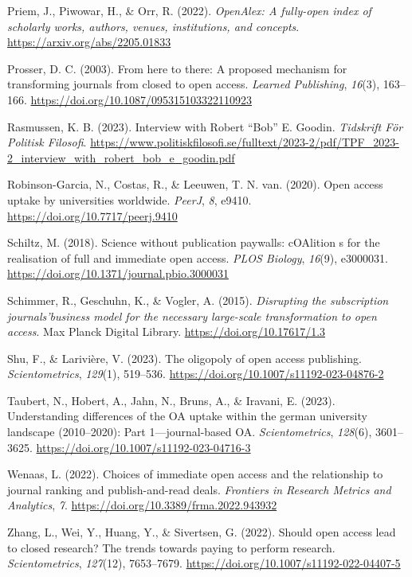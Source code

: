 \documentclass[a4paper,man,floatsintext,longtable,noextraspace,12pt]{apa6}
\newenvironment{CSLReferences}%
  {}%
  {\par}
\begin{document}
\begin{CSLReferences}{1}{0}
\leavevmode{}%
Priem, J., Piwowar, H., \& Orr, R. (2022). \emph{OpenAlex: A fully-open
index of scholarly works, authors, venues, institutions, and concepts}.
\url{https://arxiv.org/abs/2205.01833}

\leavevmode{}%
Prosser, D. C. (2003). From here to there: A proposed mechanism for
transforming journals from closed to open access. \emph{Learned
Publishing}, \emph{16}(3), 163--166.
\url{https://doi.org/10.1087/095315103322110923}

\leavevmode{}%
Rasmussen, K. B. (2023). Interview with {Robert {``Bob''} E. Goodin}.
\emph{Tidskrift För Politisk Filosofi}.
\url{https://www.politiskfilosofi.se/fulltext/2023-2/pdf/TPF_2023-2_interview_with_robert_bob_e_goodin.pdf}

\leavevmode{}%
Robinson-Garcia, N., Costas, R., \& Leeuwen, T. N. van. (2020). Open
access uptake by universities worldwide. \emph{{PeerJ}}, \emph{8},
e9410. \url{https://doi.org/10.7717/peerj.9410}

\leavevmode{}%
Schiltz, M. (2018). Science without publication paywalls: cOAlition s
for the realisation of full and immediate open access. \emph{PLOS
Biology}, \emph{16}(9), e3000031.
\url{https://doi.org/10.1371/journal.pbio.3000031}

\leavevmode{}%
Schimmer, R., Geschuhn, K., \& Vogler, A. (2015). \emph{{Disrupting the
subscription journals'business model for the necessary large-scale
transformation to open access}}. Max Planck Digital Library.
\url{https://doi.org/10.17617/1.3}

\leavevmode{}%
Shu, F., \& Larivière, V. (2023). The oligopoly of open access
publishing. \emph{Scientometrics}, \emph{129}(1), 519--536.
\url{https://doi.org/10.1007/s11192-023-04876-2}

\leavevmode{}%
Taubert, N., Hobert, A., Jahn, N., Bruns, A., \& Iravani, E. (2023).
Understanding differences of the OA uptake within the german university
landscape (2010--2020): Part 1---journal-based OA.
\emph{Scientometrics}, \emph{128}(6), 3601--3625.
\url{https://doi.org/10.1007/s11192-023-04716-3}

\leavevmode{}%
Wenaas, L. (2022). Choices of immediate open access and the relationship
to journal ranking and publish-and-read deals. \emph{Frontiers in
Research Metrics and Analytics}, \emph{7}.
\url{https://doi.org/10.3389/frma.2022.943932}

\leavevmode{}%
Zhang, L., Wei, Y., Huang, Y., \& Sivertsen, G. (2022). Should open
access lead to closed research? The trends towards paying to perform
research. \emph{Scientometrics}, \emph{127}(12), 7653--7679.
\url{https://doi.org/10.1007/s11192-022-04407-5}

\end{CSLReferences}
\end{document}
